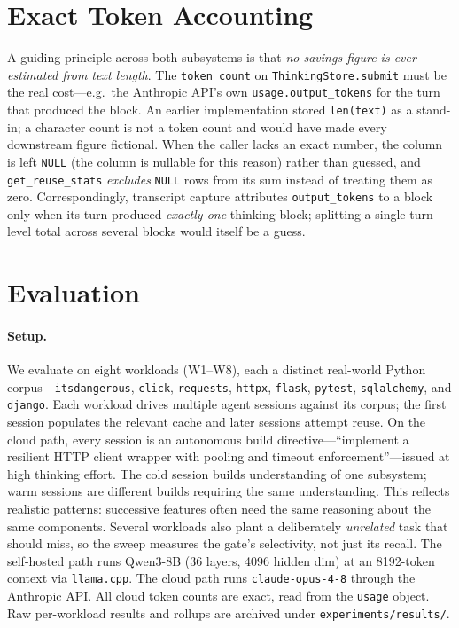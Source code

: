 \documentclass[10pt]{article}
\begin{document}
\section{Exact Token Accounting}
\label{sec:metrics}

A guiding principle across both subsystems is that \emph{no savings figure is
ever estimated from text length}. The \texttt{token\_count} on
\texttt{ThinkingStore.submit} must be the
real cost---e.g.\ the Anthropic API's own \texttt{usage.output\_tokens} for the
turn that produced the block. An earlier implementation stored
\texttt{len(text)} as a stand-in; a character count is not a token count and
would have made every downstream figure fictional. When the caller lacks an
exact number, the column is left \texttt{NULL} (the column is nullable for
this reason) rather than guessed, and \texttt{get\_reuse\_stats} \emph{excludes}
\texttt{NULL} rows from its sum instead of treating them as zero. Correspondingly,
transcript capture attributes \texttt{output\_tokens} to a block only when its
turn produced \emph{exactly one} thinking block; splitting a single turn-level
total across several blocks would itself be a guess.

\section{Evaluation}
\label{sec:eval}

\paragraph{Setup.}
We evaluate on eight workloads (W1--W8), each a distinct real-world Python
corpus---\texttt{itsdangerous}, \texttt{click}, \texttt{requests},
\texttt{httpx}, \texttt{flask}, \texttt{pytest}, \texttt{sqlalchemy}, and
\texttt{django}. Each workload drives multiple agent sessions against its
corpus; the first session populates the relevant cache and later sessions
attempt reuse. On the cloud path, every session is an autonomous build directive---``implement a
resilient HTTP client wrapper with pooling and timeout enforcement''---issued at
high thinking effort. The cold session builds understanding of one subsystem;
warm sessions are different builds requiring the same understanding. This
reflects realistic patterns: successive features often need the same reasoning
about the same components. Several workloads also plant a deliberately \emph{unrelated}
task that should miss, so the sweep measures the gate's selectivity, not just
its recall. The self-hosted path runs Qwen3-8B (36 layers, 4096
hidden dim) at an \num{8192}-token context via \texttt{llama.cpp}. The cloud
path runs \texttt{claude-opus-4-8} through the Anthropic API. All cloud token
counts are exact, read from the \texttt{usage} object. Raw per-workload results
and rollups are archived under \texttt{experiments/results/}.
\end{document}
